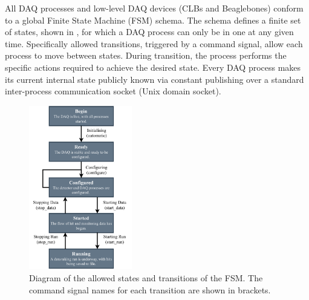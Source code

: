 All DAQ processes and low-level DAQ devices (CLBs and Beaglebones) conform to a global Finite
State Machine (FSM) schema. The schema defines a finite set of states, shown in
, for which a DAQ process can only be in one at any given time. Specifically
allowed transitions, triggered by a command signal, allow each process to move between states.
During transition, the process performs the specific actions required to achieve the desired
state. Every DAQ process makes its current internal state publicly known via constant publishing
over a standard inter-process communication socket (Unix domain socket).

\begin{figure} %
    \includegraphics[width=0.4\textwidth]{diagrams/5-daq/fsm.pdf}
    \caption[Diagram of the allowed states and transitions of the \chipsfive Finite State Machine]
    {Diagram of the allowed states and transitions of the \chipsfive FSM. The command signal names
    for each transition are shown in brackets.}
    \label{fig:fsm}
\end{figure}

